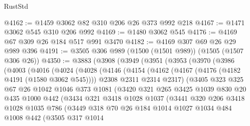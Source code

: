 \begin{lexlean}{RustStd}
\begin{coremodule}
@4162 := @1459 @3062 @82 @310 @206 @26 @373 @992 @218
@4167 := @1471 @3062 @545 @310 @206 @992
@4169 := @1480 @3062 @545
@4176 := @4169 @67 @309 @26 @184 @517 @991 @3470
@4182 := @4169 @307 @69 @26 @29 @989 @396
@4191 := @3505 @306 @989 (@1500 (@1501 @989)) (@1505 (@1507 @306 @26))
@4350 := @3883
    (@3908
      (@3949
        (@3951
          (@3953
            (@3970
              (@3986
                (@4003
                  (@4016
                    (@4024
                      (@4028
                        (@4146
                          (@4154
                            (@4162
                              (@4167 (@4176 (@4182 @4191 (@1580 @3062 @545))))
                              @2308
                              @2311
                              @2314
                              @2317)
                            (@3405
                              @323
                              @325
                              @67
                              @26
                              @1042
                              @1046
                              @373
                              @1081
                              (@3420
                                @321
                                @265
                                @3425
                                @1039
                                @830
                                @20
                                @435
                                @1000
                                @442
                                (@3434
                                  @321
                                  @3418
                                  @1028
                                  @1037
                                  (@3441
                                    @320
                                    @206
                                    @3418
                                    @1028
                                    @1035
                                    @786
                                    (@3449
                                      @318
                                      @70
                                      @26
                                      @184
                                      @1014
                                      @1027
                                      @1034
                                      @484
                                      @1008
                                      @442
                                      (@3505
                                        @317
                                        @1014

\end{coremodule}
\end{lexlean}
